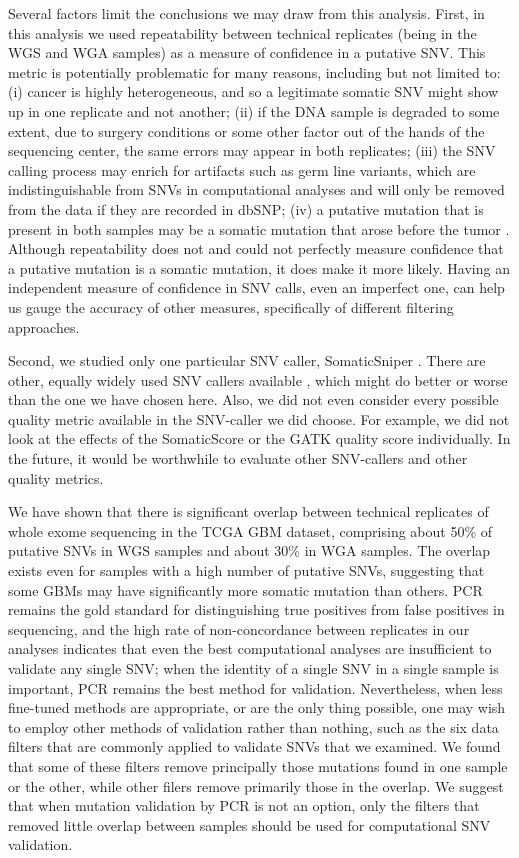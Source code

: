 \documentclass[11 pt]{article} %
\begin{document}
Several factors limit the conclusions we may draw from this analysis. First, in this analysis we used repeatability between technical replicates (being in the WGS and WGA samples) as a measure of confidence in a putative SNV. This metric is potentially problematic for many reasons, including but not limited to: (i) cancer is highly heterogeneous, and so a legitimate somatic SNV might show up in one replicate and not another; (ii) if the DNA sample is degraded to some extent, due to surgery conditions or some other factor out of the hands of the sequencing center, the same errors may appear in both replicates; (iii) the SNV calling process may enrich for artifacts such as germ line variants, which are indistinguishable from SNVs in computational analyses and will only be removed from the data if they are recorded in dbSNP; (iv) a putative mutation that is present in both samples may be a somatic mutation that arose before the tumor \citep{pre-tumor-muts}. Although repeatability does not and could not perfectly measure confidence that a putative mutation is a somatic mutation, it does make it more likely. Having an independent measure of confidence in SNV calls, even an imperfect one, can help us gauge the accuracy of other measures, specifically of different filtering approaches. 

Second, we studied only one particular SNV caller, SomaticSniper \citep{SomaticSniper}. There are other, equally widely used SNV callers available \citep{MuTect, VarScan, Strelka}, which might do better or worse than the one we have chosen here. Also, we did not even consider every possible quality metric available in the SNV-caller we did choose. For example, we did not look at the effects of the SomaticScore or the GATK quality score individually. In the future, it would be worthwhile to evaluate other SNV-callers and other quality metrics.

We have shown that there is significant overlap between technical replicates of whole exome sequencing in the TCGA GBM dataset, comprising about 50\% of putative SNVs in WGS samples and about 30\% in WGA samples. The overlap exists even for samples with a high number of putative SNVs, suggesting that some GBMs may have significantly more somatic mutation than others. PCR remains the gold standard for distinguishing true positives from false positives in sequencing, and the high rate of non-concordance between replicates in our analyses indicates that even the best computational analyses are insufficient to validate any single SNV; when the identity of a single SNV in a single sample is important, PCR remains the best method for validation. Nevertheless, when less fine-tuned methods are appropriate, or are the only thing possible, one may wish to employ other methods of validation rather than nothing, such as the six data filters that are commonly applied to validate SNVs that we examined. We found that some of these filters remove principally those mutations found in one sample or the other, while other filers remove primarily those in the overlap. We suggest that when mutation validation by PCR is not an option, only the filters that removed little overlap between samples should be used for computational SNV validation.
\end{document}
